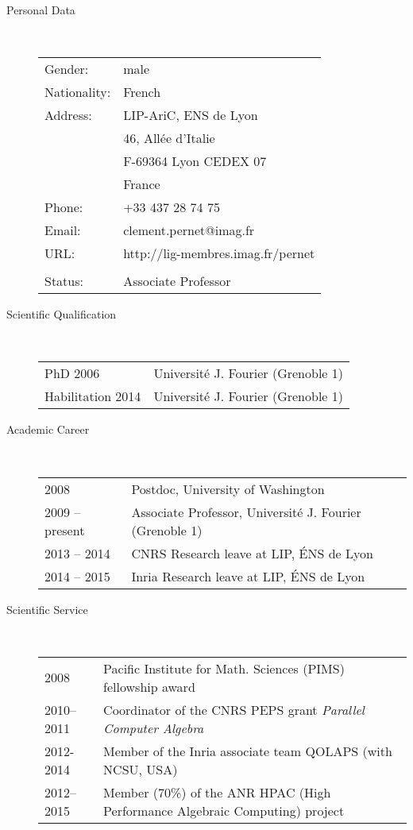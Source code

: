 \begin{description}
  \item[Personal Data]\ 

\begin{tabular}{ll}
Gender:& male \\
Nationality:  & French  \\
Address:        & LIP-AriC, ENS de Lyon\\
                & 46, All\'ee d'Italie\\
                & F-69364 Lyon CEDEX 07\\
                & France \\
Phone:          & +33 437 28 74 75 \\
Email:          & clement.pernet@imag.fr \\
URL:            & http://lig-membres.imag.fr/pernet\\ \\
Status:         & Associate Professor\\
\end{tabular}

\item[Scientific Qualification]\ 

\begin{tabular}{ll}
PhD 2006& Universit\'e J. Fourier (Grenoble 1) \\
Habilitation 2014& Universit\'e J. Fourier (Grenoble 1) \\
\end{tabular}

\item[Academic Career]\ 

\begin{tabular}{ll}
 2008 & Postdoc, University of Washington \\
 2009 -- present& Associate Professor, Universit\'e J. Fourier (Grenoble 1)\\
 2013 -- 2014 & CNRS Research leave at LIP, \'ENS de Lyon\\
 2014 -- 2015 & Inria Research leave at LIP, \'ENS de Lyon\\
\end{tabular}

\item[Scientific Service]\ 

\begin{tabular}{ll}
 2008 & Pacific Institute for Math. Sciences (PIMS) fellowship award\\
 2010--2011 & Coordinator of the CNRS PEPS grant \textit{Parallel Computer Algebra}\\
 2012-2014 & Member of the Inria associate team QOLAPS (with NCSU, USA) \\
 2012--2015 & Member (70\%) of the ANR HPAC (High Performance Algebraic
 Computing) project\\ 
\end{tabular}






\end{description}
